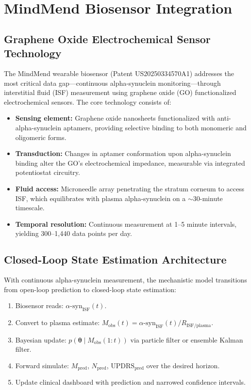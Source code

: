 \section{MindMend Biosensor Integration}
\label{sec:mech-mindmend}

\subsection{Graphene Oxide Electrochemical Sensor Technology}

The MindMend wearable biosensor (Patent US20250334570A1) addresses the most critical data gap---continuous alpha-synuclein monitoring---through interstitial fluid (ISF) measurement using graphene oxide (GO) functionalized electrochemical sensors. The core technology consists of:

\begin{itemize}
\item \textbf{Sensing element:} Graphene oxide nanosheets functionalized with anti-alpha-synuclein aptamers, providing selective binding to both monomeric and oligomeric forms.
\item \textbf{Transduction:} Changes in aptamer conformation upon alpha-synuclein binding alter the GO's electrochemical impedance, measurable via integrated potentiostat circuitry.
\item \textbf{Fluid access:} Microneedle array penetrating the stratum corneum to access ISF, which equilibrates with plasma alpha-synuclein on a $\sim$30-minute timescale.
\item \textbf{Temporal resolution:} Continuous measurement at 1--5 minute intervals, yielding 300--1,440 data points per day.
\end{itemize}

\subsection{Closed-Loop State Estimation Architecture}

With continuous alpha-synuclein measurement, the mechanistic model transitions from open-loop prediction to closed-loop state estimation:

\begin{enumerate}
\item Biosensor reads: $\alpha\text{-syn}_\text{ISF}(t)$.
\item Convert to plasma estimate: $M_\text{obs}(t) = \alpha\text{-syn}_\text{ISF}(t) / R_\text{ISF/plasma}$.
\item Bayesian update: $p(\boldsymbol{\theta} \mid M_\text{obs}(1{:}t))$ via particle filter or ensemble Kalman filter.
\item Forward simulate: $M_\text{pred}$, $N_\text{pred}$, $\text{UPDRS}_\text{pred}$ over the desired horizon.
\item Update clinical dashboard with prediction and narrowed confidence intervals.
\end{enumerate}

